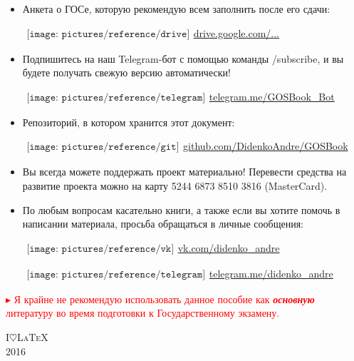 \begin{flushleft}
\begin{itemize}[wide, labelwidth=!, labelindent=0pt, label=$\blacktriangleright$, noitemsep]
\item Анкета о ГОСе, которую рекомендую всем заполнить после его сдачи:

\qquad\href{https://docs.google.com/spreadsheets/d/10jIg9Nr5oM1-Zjo_iIlKs8uxrBKrzfuJNas_YJIIxPs/edit\#gid=0}{$
\begin{array}{l}
\texttt{[image: pictures/reference/drive]}
\end{array}
$\large drive.google.com/...}

\item Подпишитесь на наш Telegram-бот с помощью команды \textsf{/subscribe}, и вы будете получать свежую версию автоматически!

\qquad\href{https://t.me/GOSBook_Bot}{$
\begin{array}{l}
\texttt{[image: pictures/reference/telegram]}
\end{array}
$\large telegram.me/GOSBook\_Bot} 

\item Репозиторий, в котором хранится этот документ:

\qquad\href{https://github.com/DidenkoAndre/GOSBook}{$
\begin{array}{l}
\texttt{[image: pictures/reference/git]}
\end{array}
$\large github.com/DidenkoAndre/GOSBook}

\item Вы всегда можете поддержать проект материально! 
Перевести средства на развитие проекта можно на карту {\large 5244 6873 8510 3816} \textsf{(MasterCard)}.

\item По любым вопросам касательно книги, а также если вы хотите помочь в написании материала, просьба обращаться в личные сообщения: 

\qquad\href{https://vk.com/didenko_andre}{$
\begin{array}{l}
\texttt{[image: pictures/reference/vk]}
\end{array}
$\large vk.com/didenko\_andre}

\qquad\href{https://telegram.me/didenko_andre}{$
\begin{array}{l}
\texttt{[image: pictures/reference/telegram]}
\end{array}
$\large telegram.me/didenko\_andre}
\end{itemize}

\smallskip
\vfill

\textcolor{red}{
$\blacktriangleright$ Я крайне не рекомендую использовать данное пособие как \textit{\textbf{основную}} литературу во время подготовки к Государственному экзамену.
}
\end{flushleft}

\medskip
\vfill
{\huge\scshape I\;$\heartsuit$\;\LaTeX}\\[0.5\baselineskip]
{\LARGE\scshape 2016}\par
\restoregeometry
\endgroup
\newpage